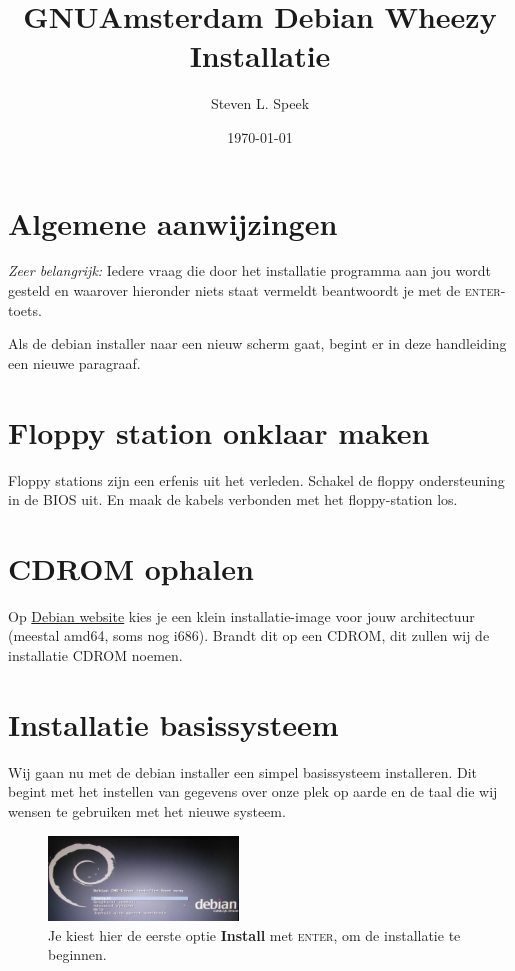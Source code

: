 \documentclass[12pt,a4paper]{article}
\begin{document}
\graphicspath{ {./images/} }
\lstset{language=bash}      
\author{Steven L. Speek}
\title{GNUAmsterdam Debian Wheezy Installatie}
\date{\today}
\maketitle
{}


\section{Algemene aanwijzingen}
\emph{Zeer belangrijk:} Iedere vraag die door het installatie programma aan jou wordt gesteld en waarover hieronder niets staat vermeldt beantwoordt je met de \textsc{enter}-toets.

Als de debian installer naar een nieuw scherm gaat, begint er in deze handleiding een nieuwe paragraaf.


\section{Floppy station onklaar maken}
Floppy stations zijn een erfenis uit het verleden. Schakel de floppy ondersteuning in de BIOS uit. En maak de kabels verbonden met het floppy-station los.


\section{CDROM ophalen}
Op \href{http://www.debian.org/distrib}{Debian website} kies je een klein installatie-image voor jouw architectuur (meestal amd64, soms nog i686).
Brandt dit op een CDROM, dit zullen wij de installatie CDROM noemen.


\section{Installatie basissysteem}
Wij gaan nu met de debian installer een simpel basissysteem installeren. Dit begint met het instellen van gegevens over onze plek op aarde en de taal die wij wensen te gebruiken met het nieuwe systeem.

\begin{figure}[H]
\centering
\includegraphics[width=0.45\textwidth]{bootmenu}
\caption{Je kiest hier de eerste optie \textbf{Install} met \textsc{enter}, om de installatie te beginnen. }
\label{fig:taal-keuze-scherm}
\end{figure}
\end{document}
